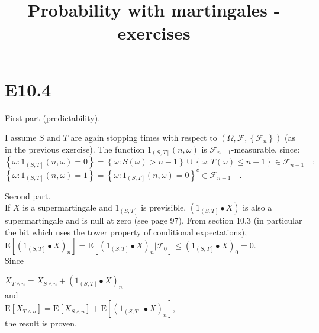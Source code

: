 \documentclass[11pt]{article} %
\title{Probability with martingales - exercises}
\author{}
\date{} %
\begin{document}
{\bf \maketitle \par}


\section*{E10.4}

\vspace{\baselineskip}
First part (predictability).

I assume $S$ and $T$ are again stopping times with respect to $\left(\Omega, \mathcal{F}, \left\lbrace \mathcal{F}_{n}\right\rbrace \right)$ (as in the previous exercise). The function $\mathrm{1}_{\left(S,T\right]}\left(n,\omega\right)$ is $\mathcal{F}_{n-1}$-measurable, since: \\

$\left\lbrace \omega : \mathrm{1}_{\left(S,T\right]}\left(n,\omega\right)=0\right\rbrace=\left\lbrace \omega : S(\omega) > n-1 \right\rbrace \cup \left\lbrace \omega : T(\omega) \leq n-1\right\rbrace \in \mathcal{F}_{n-1} \quad ;$\\

$\left\lbrace \omega : \mathrm{1}_{\left(S,T\right]}\left(n,\omega\right)=1\right\rbrace=\left\lbrace \omega : \mathrm{1}_{\left(S,T\right]}\left(n,\omega\right)=0\right\rbrace^{c} \in \mathcal{F}_{n-1} \quad .$\\
\vspace{\baselineskip}
 
Second part.\\ 
 
If $X$ is a supermartingale and $\mathrm{1}_{\left(S,T\right]}$ is previsible, $\left( \mathrm{1}_{\left(S,T\right]}\bullet X \right)$ is also a supermartingale and is null at zero (see page 97). From section 10.3 (in particular the bit which uses the tower property of conditional expectations),\\

$\mathrm{E}\left[\left(\mathrm{1}_{\left(S,T\right]}\bullet X \right)_{n} \right]=\mathrm{E}\left[\left(\mathrm{1}_{\left(S,T\right]}\bullet X \right)_{n} |\mathcal{F}_{0}\right]\leq \left(\mathrm{1}_{\left(S,T\right]}\bullet X \right)_{0}=0$. \\

Since

$X_{T\wedge n}=X_{S \wedge n}+\left(\mathrm{1}_{\left(S,T\right]}\bullet X \right)_{n}$\\

and\\

$\mathrm{E}\left[X_{T\wedge n}\right]=\mathrm{E}\left[X_{S \wedge n}\right]+\mathrm{E}\left[\left(\mathrm{1}_{\left(S,T\right]}\bullet X \right)_{n}\right]$,\\

the result is proven.


\clearpage
\end{document}

